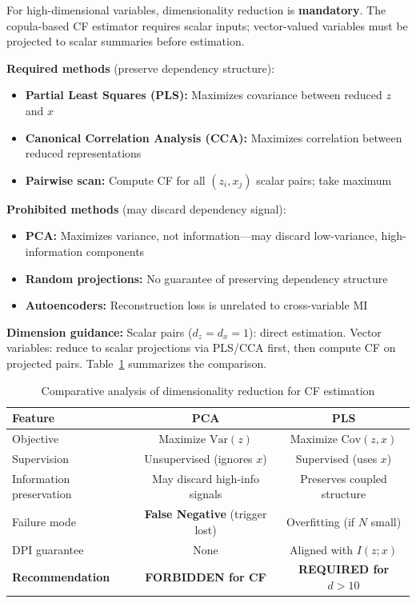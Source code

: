 \documentclass[10pt]{article} %
\theoremstyle{plain}
\theoremstyle{definition}
\newcommand{\Var}{\mathrm{Var}}
\newcommand{\Cov}{\mathrm{Cov}}
\begin{document}
\begin{tcolorbox}[breakable, colback=blue!5, colframe=blue!50!black, title=\textbf{Mandatory: Dimensionality Reduction for High-Dimensional CF}, fonttitle=\bfseries]
For high-dimensional variables, dimensionality reduction is \textbf{mandatory}. The copula-based CF estimator requires scalar inputs; vector-valued variables must be projected to scalar summaries before estimation.

\textbf{Required methods} (preserve dependency structure):
\begin{itemize}
    \item \textbf{Partial Least Squares (PLS):} Maximizes covariance between reduced $z$ and $x$
    \item \textbf{Canonical Correlation Analysis (CCA):} Maximizes correlation between reduced representations
    \item \textbf{Pairwise scan:} Compute CF for all $(z_i, x_j)$ scalar pairs; take maximum
\end{itemize}

\textbf{Prohibited methods} (may discard dependency signal):
\begin{itemize}
    \item \textbf{PCA:} Maximizes variance, not information---may discard low-variance, high-information components
    \item \textbf{Random projections:} No guarantee of preserving dependency structure
    \item \textbf{Autoencoders:} Reconstruction loss is unrelated to cross-variable MI
\end{itemize}

\textbf{Dimension guidance:} Scalar pairs ($d_z = d_x = 1$): direct estimation. Vector variables: reduce to scalar projections via PLS/CCA first, then compute CF on projected pairs. Table~\ref{tab:pca-pls} summarizes the comparison.
\end{tcolorbox}

\begin{table}[!htbp]
\centering
\caption{Comparative analysis of dimensionality reduction for CF estimation}
\label{tab:pca-pls}
\small
\begin{tabular}{lcc}
\toprule
\textbf{Feature} & \textbf{PCA} & \textbf{PLS} \\
\midrule
Objective & Maximize $\Var(z)$ & Maximize $\Cov(z,x)$ \\
Supervision & Unsupervised (ignores $x$) & Supervised (uses $x$) \\
Information preservation & May discard high-info signals & Preserves coupled structure \\
Failure mode & \textbf{False Negative} (trigger lost) & Overfitting (if $N$ small) \\
DPI guarantee & None & Aligned with $I(z;x)$ \\
\textbf{Recommendation} & \textbf{FORBIDDEN for CF} & \textbf{REQUIRED for $d > 10$} \\
\bottomrule
\end{tabular}
\end{table}
\end{document}
